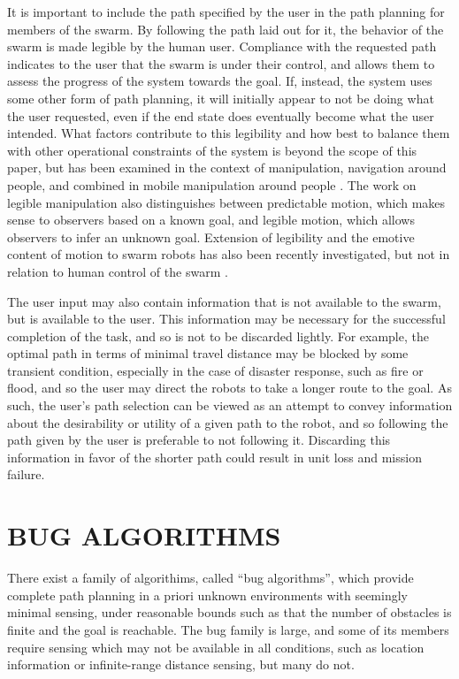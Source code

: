 \documentclass[letterpaper, 10 pt, conference]{ieeeconf}  %
\begin{document}
It is important to include the path specified by the user in the path planning for members of the swarm. 
By following the path laid out for it, the behavior of the swarm is made legible by the human user. 
Compliance with the requested path indicates to the user that the swarm is under their control, and allows them to assess the progress of the system towards the goal. 
If, instead, the system uses some other form of path planning, it will initially appear to not be doing what the user requested, even if the end state does eventually become what the user intended. 
What factors contribute to this legibility and how best to balance them with other operational constraints of the system is beyond the scope of this paper, but has been examined in the context of manipulation, navigation around people, and combined in mobile manipulation around people \cite{beetz2010generality, kruse2013human, dragan2015effects}.
The work on legible manipulation also distinguishes between predictable motion, which makes sense to observers based on a known goal, and legible motion, which allows observers to infer an unknown goal. 
Extension of legibility and the emotive content of motion to swarm robots has also been recently investigated, but not in relation to human control of the swarm \cite{Dietz:2017:HPS:3027063.3053220}.

The user input may also contain information that is not available to the swarm, but is available to the user. 
This information may be necessary for the successful completion of the task, and so is not to be discarded lightly. 
For example, the optimal path in terms of minimal travel distance may be blocked by some transient condition, especially in the case of disaster response, such as fire or flood, and so the user may direct the robots to take a longer route to the goal.
As such, the user's path selection can be viewed as an attempt to convey information about the desirability or utility of a given path to the robot, and so following the path given by the user is preferable to not following it.  
Discarding this information in favor of the shorter path could result in unit loss and mission failure.

\section{BUG ALGORITHMS}
There exist a family of algorithims, called ``bug algorithms'', which provide complete path planning in a priori unknown environments with seemingly minimal sensing, under reasonable bounds such as that the number of obstacles is finite and the goal is reachable. 
The bug family is large, and some of its members require sensing which may not be available in all conditions, such as location information or infinite-range distance sensing, but many do not. 
\end{document}
